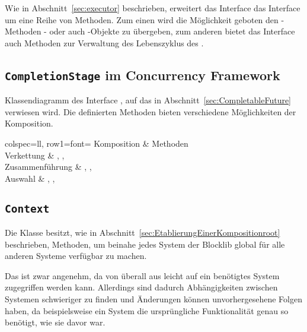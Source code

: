 Wie in Abschnitt~\vref{sec:executor} beschrieben, erweitert das Interface \classExecutorService{} das Interface \classExecutor{} um eine Reihe von Methoden. Zum einen wird die Möglichkeit geboten den -Methoden \classRunnable{}- oder auch \classCallable{}-Objekte zu übergeben, zum anderen bietet das Interface auch Methoden zur Verwaltung des Lebenszyklus des \classExecutorService{}.

\clearpage
\subsection{\texttt{CompletionStage} im Concurrency Framework}\label{appendix:CompletionStage}


Klassendiagramm des Interface \classCompletionStage{}, auf das in Abschnitt~\vref{sec:CompletableFuture} verwiesen wird. Die definierten Methoden bieten verschiedene Möglichkeiten der Komposition.

\begin{tblr}{
	colspec={ll},
	row{1}={font=\bfseries}
	}
	Komposition & Methoden \\
	Verkettung & , , \\
	Zusammenführung & , ,  \\
	Auswahl & , ,  \\
\end{tblr}

\clearpage
\subsection{\texttt{Context}}\label{appendix:context}
{
	\centering
	
	\par
}
Die Klasse \classContext{} besitzt, wie in Abschnitt~\vref{sec:EtablierungEinerKompositionroot} beschrieben, Methoden, um beinahe jedes System der Blocklib global für alle anderen Systeme verfügbar zu machen. 

Das ist zwar angenehm, da von überall aus leicht auf ein benötigtes System zugegriffen werden kann. Allerdings sind dadurch Abhängigkeiten zwischen Systemen schwieriger zu finden und Änderungen können unvorhergesehene Folgen haben, da beispielsweise ein System die ursprüngliche Funktionalität genau so benötigt, wie sie davor war. 

